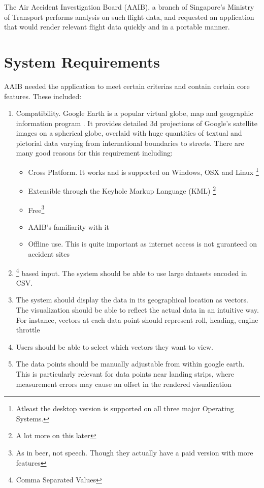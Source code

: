 The Air Accident Investigation Board (AAIB), a branch of Singapore's Ministry of Transport performs analysis on such flight data, and requested an application that would render relevant flight data quickly and in a portable manner. \\

\section{System Requirements}

AAIB needed the application to meet certain criterias and contain certain core features. These included:

\begin{enumerate}
  \item {} Compatibility. Google Earth is a popular virtual globe, map and geographic information program \citep{google:earth}. It provides detailed 3d projections of Google's satellite images on a spherical globe, overlaid with huge quantities of textual and pictorial data varying from international boundaries to streets. There are many good reasons for this requirement including:
    \begin{itemize}
      \item Cross Platform. It works and is supported on Windows, OSX and Linux \footnote{Atleast the desktop version is supported on all three major Operating Systems.}
      \item Extensible through the Keyhole Markup Language (KML) \footnote{A lot more on this later}
      \item Free\footnote{As in beer, not speech. Though they actually have a paid version with more features}
      \item AAIB's familiarity with it
      \item Offline use. This is quite important as internet access is not guranteed on accident sites
    \end{itemize}
  \item {}\footnote{Comma Separated Values} based input. The system should be able to use large datasets encoded in CSV.
  \item  The system should display the data in its geographical location as vectors. The visualization should be able to reflect the actual data in an intuitive way. For instance, vectors at each data point should represent roll, heading, engine throttle
  \item Users should be able to select which vectors they want to view.
  \item The data points should be manually adjustable from within google earth. This is particularly relevant for data points near landing strips, where measurement errors may cause an offset in the rendered visualization

\end{enumerate}
